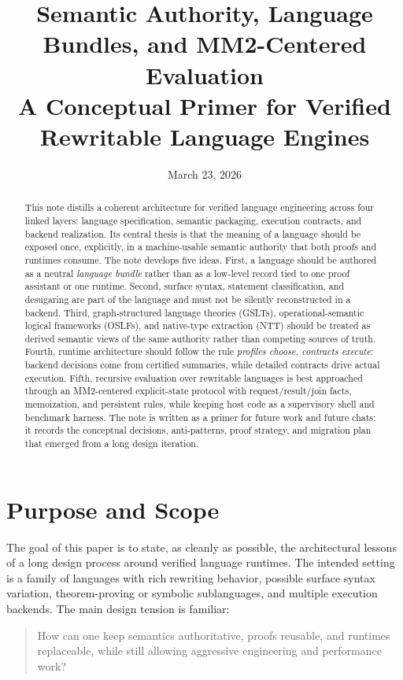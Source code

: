 \documentclass[11pt]{article}
\title{Semantic Authority, Language Bundles, and MM2-Centered Evaluation\\
\large A Conceptual Primer for Verified Rewritable Language Engines}
\author{}
\date{March 23, 2026}
\begin{document}
\maketitle

\begin{abstract}
This note distills a coherent architecture for verified language engineering across four linked layers: language specification, semantic packaging, execution contracts, and backend realization. Its central thesis is that the meaning of a language should be exposed once, explicitly, in a machine-usable semantic authority that both proofs and runtimes consume. The note develops five ideas. First, a language should be authored as a neutral \emph{language bundle} rather than as a low-level record tied to one proof assistant or one runtime. Second, surface syntax, statement classification, and desugaring are part of the language and must not be silently reconstructed in a backend. Third, graph-structured language theories (GSLTs), operational-semantic logical frameworks (OSLFs), and native-type extraction (NTT) should be treated as derived semantic views of the same authority rather than competing sources of truth. Fourth, runtime architecture should follow the rule \emph{profiles choose, contracts execute}: backend decisions come from certified summaries, while detailed contracts drive actual execution. Fifth, recursive evaluation over rewritable languages is best approached through an MM2-centered explicit-state protocol with request/result/join facts, memoization, and persistent rules, while keeping host code as a supervisory shell and benchmark harness. The note is written as a primer for future work and future chats: it records the conceptual decisions, anti-patterns, proof strategy, and migration plan that emerged from a long design iteration.
\end{abstract}

\tableofcontents

\section{Purpose and Scope}

The goal of this paper is to state, as cleanly as possible, the architectural lessons of a long design process around verified language runtimes. The intended setting is a family of languages with rich rewriting behavior, possible surface syntax variation, theorem-proving or symbolic sublanguages, and multiple execution backends. The main design tension is familiar:
\begin{quote}
How can one keep semantics authoritative, proofs reusable, and runtimes replaceable, while still allowing aggressive engineering and performance work?
\end{quote}
\end{document}
